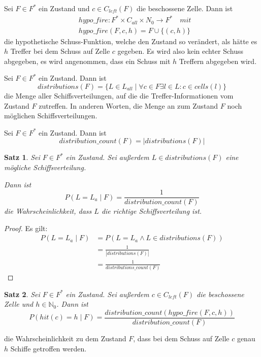 \documentclass[a4paper,12pt]{llncs}
\newcommand{\N}{{\mathbb{N}}}
\numberwithin{equation}{section}
\newtheorem{satz}{Satz}
\begin{document}
\begin{definition}
Sei $F\in F^*$ ein Zustand und $c \in C_{left}(F)$ die beschossene Zelle.
Dann ist
\begin{align}
&hypo\_fire:F^*\times C_{all}\times N_0 \rightarrow F^* \quad mit \nonumber\\
&hypo\_fire(F, c, h)=F \cup \{(c, h)\}\nonumber
\end{align}
die hypothetische Schuss-Funktion, welche den Zustand so verändert, als hätte es $h$ Treffer bei dem Schuss auf Zelle $c$ gegeben. Es wird also kein echter Schuss abgegeben, es wird angenommen, dass ein Schuss mit $h$ Treffern abgegeben wird.
\end{definition}

\begin{definition}
Sei $F\in F^*$ ein Zustand.
Dann ist
\[
distributions(F)=\{L\in L_{all} \mid \forall c\in F\exists l\in L : c\in cells(l)\}
\]
die Menge aller Schiffsverteilungen, auf die die Treffer-Informationen vom Zustand $F$ zutreffen.
In anderen Worten, die Menge an zum Zustand $F$ noch möglichen Schiffsverteilungen.
\end{definition}

\begin{definition}
Sei $F\in F^*$ ein Zustand.
Dann ist
\[
distribution\_count(F)=|distributions(F)|
\]
\end{definition}


\begin{satz}
Sei $F\in F^*$ ein Zustand.
Sei außerdem $L \in distributions(F)$ eine mögliche Schiffsverteilung.

Dann ist
\[
P(L = L_a \mid F)=\frac{1}{distribution\_count(F)}
\]
die Wahrscheinlichkeit, dass $L$ die richtige Schiffsverteilung ist.
\end{satz}

\begin{proof}
Es gilt:
\begin{align}
P(L=L_a\mid F) &= P(L=L_a \land L\in distributions(F))\nonumber\\ &= \frac{1}{\left|distributions(F)\right|} \nonumber\\ &= \frac{1}{distributions\_count(F)}\nonumber
\end{align}
\end{proof}


\begin{satz}
Sei $F\in F^*$ ein Zustand.
Sei außerdem $c \in C_{left}(F)$ die beschossene Zelle und $h \in \N_0$.
Dann ist
\[
P(hit(c)=h \mid F)=\frac{distribution\_count(hypo\_fire(F,c, h))}{distribution\_count(F)}
\]
\end{satz}
die Wahrscheinlichkeit zu dem Zustand $F$, dass bei dem Schuss auf Zelle $c$ genau $h$ Schiffe getroffen werden.
\end{document}
